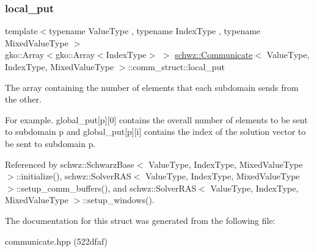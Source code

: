 \subsubsection{\texorpdfstring{local\+\_\+put}{local\_put}}
{\footnotesize\ttfamily template$<$typename Value\+Type , typename Index\+Type , typename Mixed\+Value\+Type $>$ \\
gko\+::\+Array$<$gko\+::\+Array$<$Index\+Type$>$ $>$ \hyperlink{classschwz_1_1Communicate}{schwz\+::\+Communicate}$<$ Value\+Type, Index\+Type, Mixed\+Value\+Type $>$\+::comm\+\_\+struct\+::local\+\_\+put}



The array containing the number of elements that each subdomain sends from the other. 

For example. global\+\_\+put\mbox{[}p\mbox{]}\mbox{[}0\mbox{]} contains the overall number of elements to be sent to subdomain p and global\+\_\+put\mbox{[}p\mbox{]}\mbox{[}i\mbox{]} contains the index of the solution vector to be sent to subdomain p. 

Referenced by schwz\+::\+Schwarz\+Base$<$ Value\+Type, Index\+Type, Mixed\+Value\+Type $>$\+::initialize(), schwz\+::\+Solver\+R\+A\+S$<$ Value\+Type, Index\+Type, Mixed\+Value\+Type $>$\+::setup\+\_\+comm\+\_\+buffers(), and schwz\+::\+Solver\+R\+A\+S$<$ Value\+Type, Index\+Type, Mixed\+Value\+Type $>$\+::setup\+\_\+windows().



The documentation for this struct was generated from the following file\+:\begin{DoxyCompactItemize}
\item 
communicate.\+hpp (522dfaf)\end{DoxyCompactItemize}
